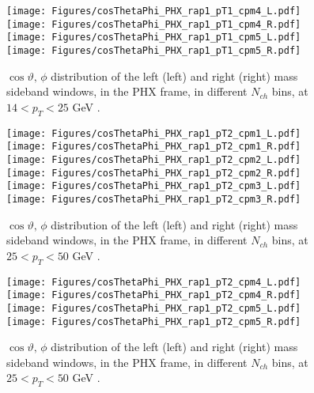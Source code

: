 \documentclass[12pt]{article}
\begin{document}
\begin{figure}[htbp]
\centering
\texttt{[image: Figures/cosThetaPhi\_PHX\_rap1\_pT1\_cpm4\_L.pdf]}
\texttt{[image: Figures/cosThetaPhi\_PHX\_rap1\_pT1\_cpm4\_R.pdf]}
\texttt{[image: Figures/cosThetaPhi\_PHX\_rap1\_pT1\_cpm5\_L.pdf]}
\texttt{[image: Figures/cosThetaPhi\_PHX\_rap1\_pT1\_cpm5\_R.pdf]}
\caption{$\cos\vartheta,\,\phi$ distribution of the left (left) and
  right (right) mass sideband windows, in the PHX frame, in different
  $N_{ch}$ bins, at $14 < p_{T} < 25$ GeV .}
\end{figure}
\clearpage


\begin{figure}[htbp]
\centering
\texttt{[image: Figures/cosThetaPhi\_PHX\_rap1\_pT2\_cpm1\_L.pdf]}
\texttt{[image: Figures/cosThetaPhi\_PHX\_rap1\_pT2\_cpm1\_R.pdf]}
\texttt{[image: Figures/cosThetaPhi\_PHX\_rap1\_pT2\_cpm2\_L.pdf]}
\texttt{[image: Figures/cosThetaPhi\_PHX\_rap1\_pT2\_cpm2\_R.pdf]}
\texttt{[image: Figures/cosThetaPhi\_PHX\_rap1\_pT2\_cpm3\_L.pdf]}
\texttt{[image: Figures/cosThetaPhi\_PHX\_rap1\_pT2\_cpm3\_R.pdf]}
\caption{$\cos\vartheta,\,\phi$ distribution of the left (left) and
  right (right) mass sideband windows, in the PHX frame, in different
  $N_{ch}$ bins, at $25 < p_{T} < 50$ GeV .}
\end{figure}
\clearpage

\begin{figure}[htbp]
\centering
\texttt{[image: Figures/cosThetaPhi\_PHX\_rap1\_pT2\_cpm4\_L.pdf]}
\texttt{[image: Figures/cosThetaPhi\_PHX\_rap1\_pT2\_cpm4\_R.pdf]}
\texttt{[image: Figures/cosThetaPhi\_PHX\_rap1\_pT2\_cpm5\_L.pdf]}
\texttt{[image: Figures/cosThetaPhi\_PHX\_rap1\_pT2\_cpm5\_R.pdf]}
\caption{$\cos\vartheta,\,\phi$ distribution of the left (left) and
  right (right) mass sideband windows, in the PHX frame, in different
  $N_{ch}$ bins, at $25 < p_{T} < 50$ GeV .}
\end{figure}
\clearpage
\end{document}
